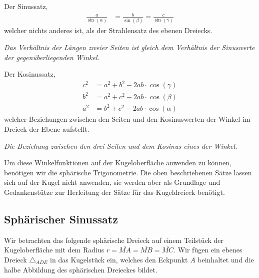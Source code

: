 \begin{refsection}
Der Sinussatz,
\begin{align*}
\frac{ a }{\sin(\alpha) } &= \frac{ b }{\sin(\beta)} = \frac{ c }{\sin(\gamma)}
\end{align*}
welcher nichts anderes ist, als der Strahlensatz des ebenen Dreiecks. 

\begin{satz}\textit{Das Verhältnis der Längen zweier Seiten ist gleich dem Verhältnis der Sinuswerte der gegenüberliegenden Winkel.}
\label{skript:kugel:satz:SinussatzEbene}
\end{satz}

Der Kosinussatz,
\begin{align*}
c^{ 2 } &= a^{ 2 } + b^{ 2 } - 2ab\cdot \cos(\gamma)\\
b^{ 2 } &= a^{ 2 } + c^{ 2 } - 2ab\cdot \cos(\beta)\\
a^{ 2 } &= b^{ 2 } + c^{ 2 } - 2ab\cdot \cos(\alpha)
\end{align*}
welcher Beziehungen zwischen den Seiten und den Kosinuswerten der Winkel im Dreieck der Ebene aufstellt.

\begin{satz}\textit{Die Beziehung zwischen den drei Seiten und dem Kosinus eines der Winkel.}
\label{skript:kugel:satz:KosinussatzEbene}
\end{satz}

Um diese Winkelfunktionen auf der Kugeloberfläche anwenden zu können, benötigen wir die sphärische Trigonometrie. Die oben beschriebenen Sätze lassen sich auf der Kugel nicht anwenden, sie werden aber als Grundlage und Gedankenstütze zur Herleitung der Sätze für das Kugeldreieck benötigt.


\subsection{Sphärischer Sinussatz}
Wir betrachten das folgende sphärische Dreieck auf einem Teilstück der Kugeloberfläche mit dem Radius $r= \overline{MA} = \overline{MB} = \overline{MC}$. Wir fügen ein ebenes Dreieck $\triangle_{ADE}$ in das Kugelstück ein, welches den Eckpunkt $A$ beinhaltet und die halbe Abbildung des sphärischen Dreieckes bildet.


\end{refsection}
